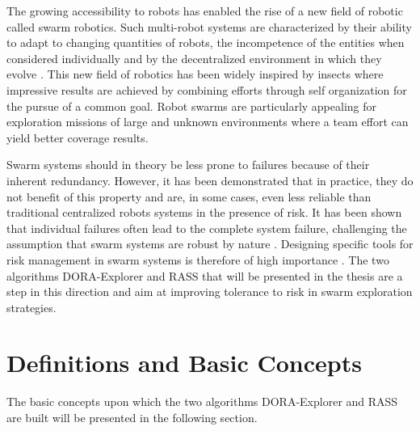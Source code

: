 
\label{sec:Introduction}  %

The growing accessibility to robots has enabled the rise of a new field of robotic called swarm robotics. Such multi-robot systems are characterized by their ability to adapt to changing quantities of robots, the incompetence of the entities when considered individually and by the decentralized environment in which they evolve \cite{sahin2005swarm}. This new field of robotics has been widely inspired by insects where impressive results are achieved by combining efforts through self organization for the pursue of a common goal. Robot swarms are particularly appealing for exploration missions of large and unknown environments where a team effort can yield better coverage results.

Swarm systems should in theory be less prone to failures because of their inherent redundancy. However, it has been demonstrated that in practice, they do not benefit of this property and are, in some cases, even less reliable than traditional centralized robots systems in the presence of risk. It has been shown that individual failures often lead to the complete system failure, challenging the assumption that swarm systems are robust by nature \cite{bjerknes2013fault}. Designing specific tools for risk management in swarm systems is therefore of high importance \cite{prorok2021beyond}. The two algorithms DORA-Explorer and RASS that will be presented in the thesis are a step in this direction and aim at improving tolerance to risk in swarm exploration strategies.

\section{Definitions and Basic Concepts}  %
The basic concepts upon which the two algorithms DORA-Explorer and RASS are built will be presented in the following section. 


